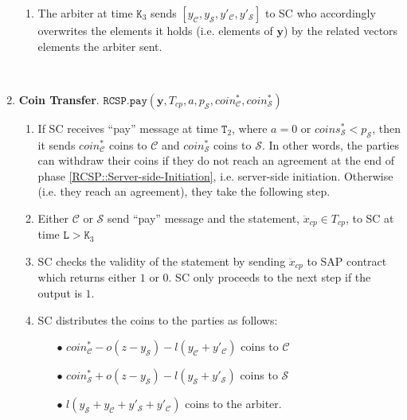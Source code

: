 \begin{enumerate}
\begin{enumerate}
\item The arbiter at time $\texttt{K}_{\scriptscriptstyle 3}$ sends $[y_{\scriptscriptstyle\mathcal C},y_{\scriptscriptstyle\mathcal S},  y'_{\scriptscriptstyle\mathcal C},y'_{\scriptscriptstyle\mathcal S}]$  to SC who accordingly overwrites the  elements it holds (i.e. elements of $\bm{y}$) by  the related vectors elements the arbiter sent.  
\end{enumerate}

\

\item \textbf{Coin Transfer}\label{RCSP::CoinTransfer}. $\mathtt{RCSP}.\mathtt{pay}(\bm{y},T_{\scriptscriptstyle cp},a,p_{\scriptscriptstyle\mathcal S}, coin^{\scriptscriptstyle *}_{\scriptscriptstyle\mathcal C},coin^{\scriptscriptstyle *}_{\scriptscriptstyle\mathcal S})$
\begin{enumerate}
 
 \item If SC  receives  ``pay'' message  at time $\texttt{T}_{2}$, where $a=0$ or $coins^{*}_{\scriptscriptstyle\mathcal{S}}<p_{\scriptscriptstyle\mathcal{S}}$, then it sends $coin^{\scriptscriptstyle *}_{\scriptscriptstyle\mathcal C}$ coins to $\mathcal C$ and $coin^{\scriptscriptstyle *}_{\scriptscriptstyle\mathcal S}$ coins to $\mathcal S$. In other words, the parties can withdraw their coins if they do not reach an agreement at the end of   phase \ref{RCSP::Server-side-Initiation}, i.e. server-side initiation.  Otherwise (i.e. they reach an agreement), they take the following step. 

\item Either $\mathcal C$ or $\mathcal S$ send ``pay'' message and the statement, $\ddot{x}_{\scriptscriptstyle cp}\in T_{\scriptscriptstyle cp}$,  to SC at time $\texttt{L}>\texttt{K}_{\scriptscriptstyle 3}$
\item SC checks the validity of the statement by sending $\ddot{x}_{\scriptscriptstyle cp}$ to SAP contract which  returns  either $1$ or $0$. SC only proceeds to the next step if the output is $1$. 
\item SC distributes the coins to the parties as follows:

\begin{itemize}
\item[$\bullet$]   $coin^{\scriptscriptstyle *}_{\scriptscriptstyle\mathcal C}-o(z-y_{\scriptscriptstyle\mathcal S})-l(y_{\scriptscriptstyle\mathcal C}+y'_{\scriptscriptstyle\mathcal C})$ coins  to $\mathcal C$
\item[$\bullet$] $coin^{\scriptscriptstyle *}_{\scriptscriptstyle\mathcal S}+o(z-y_{\scriptscriptstyle\mathcal S})-l(y_{\scriptscriptstyle\mathcal S}+y'_{\scriptscriptstyle\mathcal S})$ coins to $\mathcal S$
\item[$\bullet$] $l(y_{\scriptscriptstyle\mathcal S}+y_{\scriptscriptstyle\mathcal C}+y'_{\scriptscriptstyle\mathcal S}+y'_{\scriptscriptstyle\mathcal C})$ coins to the arbiter.  
\end{itemize}

\end{enumerate}
\end{enumerate}



